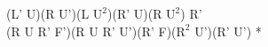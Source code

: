 (L' U)(R U')(L $\text{U}^2$)(R' U)(R $\text{U}^2$) R'\\
(R U R' F')(R U R' U')(R' F)($\text{R}^2$ U')(R' U') *\\
